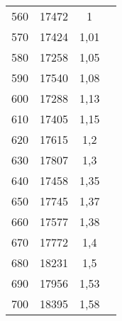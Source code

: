 \begin{table}
\begin{tabular}{c c c c}
  560 & 17472 & 1 \\
  570 & 17424 & 1,01 \\
  580 & 17258 & 1,05 \\
  590 & 17540 & 1,08 \\
  600 & 17288 & 1,13 \\
  610 & 17405 & 1,15 \\
  620 & 17615 & 1,2 \\
  630 & 17807 & 1,3 \\
  640 & 17458 & 1,35 \\
  650 & 17745 & 1,37 \\
  660 & 17577 & 1,38 \\
  670 & 17772 & 1,4 \\
  680 & 18231 & 1,5 \\
  690 & 17956 & 1,53 \\
  700 & 18395 & 1,58 \\
  \bottomrule
\end{tabular}
\end{table}
